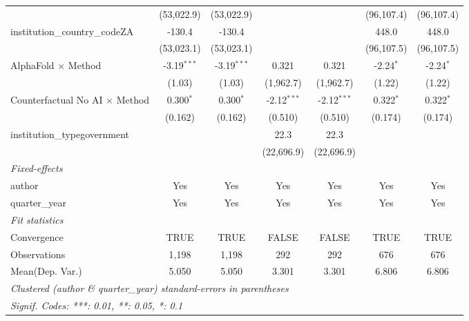 \begin{tabular}{lcccccc}
                                         & (53,022.9)    & (53,022.9)    &               &               & (96,107.4)    & (96,107.4)\\   
   institution\_country\_codeZA          & -130.4        & -130.4        &               &               & 448.0         & 448.0\\   
                                         & (53,023.1)    & (53,023.1)    &               &               & (96,107.5)    & (96,107.5)\\   
   AlphaFold $\times$ Method             & -3.19$^{***}$ & -3.19$^{***}$ & 0.321         & 0.321         & -2.24$^{*}$   & -2.24$^{*}$\\   
                                         & (1.03)        & (1.03)        & (1,962.7)     & (1,962.7)     & (1.22)        & (1.22)\\   
   Counterfactual No AI $\times$ Method  & 0.300$^{*}$   & 0.300$^{*}$   & -2.12$^{***}$ & -2.12$^{***}$ & 0.322$^{*}$   & 0.322$^{*}$\\   
                                         & (0.162)       & (0.162)       & (0.510)       & (0.510)       & (0.174)       & (0.174)\\   
   institution\_typegovernment           &               &               & 22.3          & 22.3          &               &   \\   
                                         &               &               & (22,696.9)    & (22,696.9)    &               &   \\   
   \midrule
   \emph{Fixed-effects}\\
   author                                & Yes           & Yes           & Yes           & Yes           & Yes           & Yes\\  
   quarter\_year                         & Yes           & Yes           & Yes           & Yes           & Yes           & Yes\\  
   \midrule
   \emph{Fit statistics}\\
   Convergence                           &TRUE           & TRUE          & FALSE         & FALSE         & TRUE          & TRUE\\  
   Observations                          & 1,198         & 1,198         & 292           & 292           & 676           & 676\\  
Mean(Dep. Var.) & 5.050 & 5.050 & 3.301 & 3.301 & 6.806 & 6.806 \\
   \midrule \midrule
   \multicolumn{7}{l}{\emph{Clustered (author \& quarter\_year) standard-errors in parentheses}}\\
   \multicolumn{7}{l}{\emph{Signif. Codes: ***: 0.01, **: 0.05, *: 0.1}}\\
\end{tabular}
\par\endgroup
